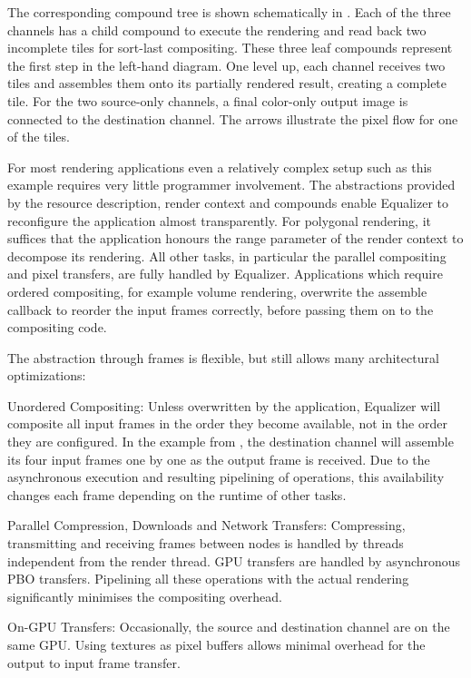 The corresponding compound tree is shown schematically in .
Each of the three channels has a child compound to execute the rendering and
read back two incomplete tiles for sort-last compositing. These three leaf
compounds represent the first step in the left-hand diagram. One level up, each
channel receives two tiles and assembles them onto its partially rendered
result, creating a complete tile. For the two source-only channels, a final
color-only output image is connected to the destination channel. The arrows
illustrate the pixel flow for one of the tiles.

For most rendering applications even a relatively complex setup such as this
example requires very little programmer involvement. The abstractions provided
by the resource description, render context and compounds enable Equalizer to
reconfigure the application almost transparently. For polygonal rendering, it
suffices that the application honours the \textsf{range} parameter of the render
context to decompose its rendering. All other tasks, in particular the parallel
compositing and pixel transfers, are fully handled by Equalizer. Applications
which require ordered compositing, for example volume rendering, overwrite the
assemble callback to reorder the input frames correctly, before passing them on
to the compositing code.

The abstraction through frames is flexible, but still allows many architectural
optimizations:
\begin{compactdesc}
\item[Unordered Compositing:] Unless overwritten by the application, Equalizer
will composite all input frames in the order they become available, not in the
order they are configured. In the example from , the
destination channel will assemble its four input frames one by one as the output
frame is received. Due to the asynchronous execution and resulting pipelining of
operations, this availability changes each frame depending on the runtime of
other tasks.

\item[Parallel Compression, Downloads and Network Transfers:] Compressing,
transmitting and receiving frames between nodes is handled by threads
independent from the render thread. GPU transfers are handled by asynchronous
PBO transfers. Pipelining all these operations with the actual rendering
significantly minimises the compositing overhead.

\item[On-GPU Transfers:] Occasionally, the source and destination channel are on
the same GPU. Using textures as pixel buffers allows minimal overhead for the
output to input frame transfer.
\end{compactdesc}

